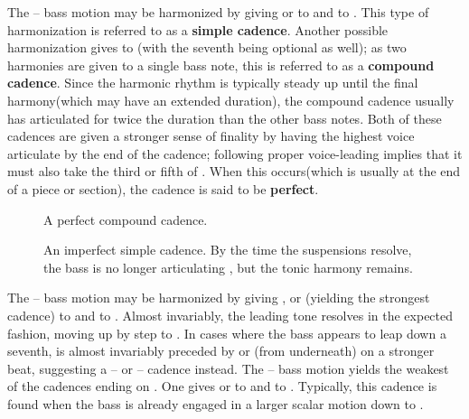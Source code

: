 The  --  bass motion may be harmonized by giving  or  to  and  to . This type of harmonization is referred to as a \textbf{simple cadence}. Another possible harmonization gives  to (with the seventh being optional as well); as two harmonies are given to a single bass note, this is referred to as a \textbf{compound cadence}. Since the harmonic rhythm is typically steady up until the final harmony(which may have an extended duration), the compound cadence usually has  articulated for twice the duration than the other bass notes. Both of these cadences are given a stronger sense of finality by having the highest voice articulate  by the end of the cadence; following proper voice-leading implies that it must also take the third or fifth of . When this occurs(which is usually at the end of a piece or section), the cadence is said to be \textbf{perfect}.
\begin{figure}[h]
\centering
{}
\vspace{-5pt}
\caption{A perfect compound cadence. }
\end{figure}
\begin{figure}[h]
\centering
{}
\caption{An imperfect simple cadence. By the time the suspensions resolve, the bass is no longer articulating , but the tonic harmony remains.  }
\end{figure}
The  --  bass motion may be harmonized by giving ,  or (yielding the strongest cadence) to  and  to . Almost invariably, the leading tone resolves in the expected fashion, moving up by step to . In cases where the bass appears to leap down a seventh,  is almost invariably preceded by  or (from underneath) on a stronger beat, suggesting a  --  or  --  cadence instead. The  --  bass motion yields the weakest of the cadences ending on . One gives  or  to  and  to . Typically, this cadence is found when the bass is already engaged in a larger scalar motion down to .

